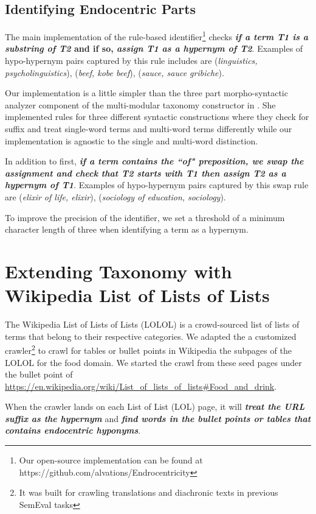 \subsection{Identifying Endocentric Parts}

The main implementation of the rule-based identifier\footnote{Our open-source implementation can be found at https://github.com/alvations/Endrocentricity} checks \textbf{\emph{if a term T1 is a substring of T2} and if so, \emph{assign T1 as a hypernym of T2}}. Examples of hypo-hypernym pairs captured by this rule includes are (\emph{linguistics, psycholinguistics}), (\emph{beef, kobe beef}), (\emph{sauce, sauce gribiche}). 

Our implementation is a little simpler than the three part morpho-syntactic analyzer component of the multi-modular taxonomy constructor in \cite{lefever:2015:SemEval}. She implemented rules for three different syntactic constructions where they check for suffix and treat single-word terms and multi-word terms differently while our implementation is agnostic to the single and multi-word distinction. 

In addition to first, \emph{\textbf{if a term contains the ``of" preposition, we swap the assignment and check that T2 starts with T1 then assign T2 as a hypernym of T1}}. Examples of hypo-hypernym pairs captured by this swap rule are (\emph{elixir of life, elixir}), (\emph{sociology of education, sociology}). 

To improve the precision of the identifier, we set a threshold of a minimum character length of three when identifying a term as a hypernym. 

\section{Extending Taxonomy with Wikipedia List of Lists of Lists}

The Wikipedia List of Lists of Lists (LOLOL) is a crowd-sourced list of lists of terms that belong to their respective categories.  We adapted the a customized crawler\footnote{It was built for crawling translations and diachronic texts in previous SemEval tasks} \citep{tan-EtAl:2014:SemEval,tan-ordan:2015:SemEval} to crawl for tables or bullet points in Wikipedia the subpages of the LOLOL for the food domain. We started the crawl from these seed pages under the bullet point of \url{ https://en.wikipedia.org/wiki/List\_of\_lists\_of\_lists\#Food\_and\_drink}.

When the crawler lands on each List of List (LOL) page, it will \emph{\textbf{treat the URL suffix as the hypernym}} and \emph{\textbf{find words in the bullet points or tables that contains endocentric hyponyms}}. 

